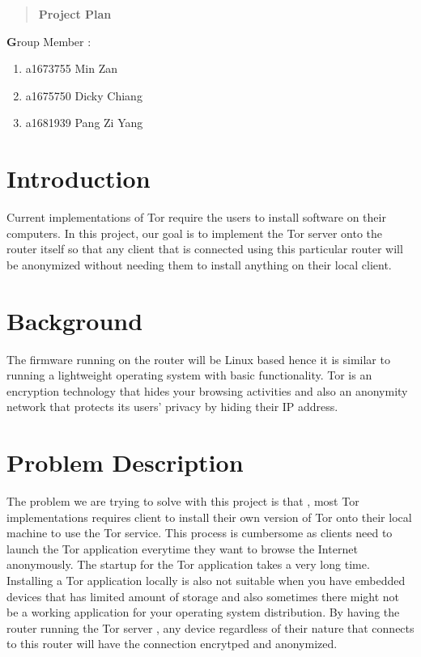 \documentclass[12pt]{article}
\begin{document}
	\begin{quote}
		\centering
		\textbf {Project Plan}
	\end{quote}
	
	\textbf Group Member :
	\begin{enumerate}
		\item a1673755 Min Zan 
		\item a1675750 Dicky Chiang 
		\item a1681939 Pang Zi Yang
	\end{enumerate}
	
	\section{Introduction}
	
	 Current implementations of Tor require the users to install software on their computers. In this project, our goal is to implement the Tor server onto the router itself so that any client that is connected using this particular router will be anonymized without needing them to install anything on their local client.
	
	
	\section{Background}
	The firmware running on the router will be Linux based hence it is similar to running a lightweight operating system with basic functionality. Tor is an encryption technology that hides your browsing activities and also an anonymity network that protects its users' privacy by hiding their IP address.
	
	\section{Problem Description}
	
	The problem we are trying to solve with this project is that , most Tor implementations requires client to install their own version of Tor onto their local machine to use the Tor service. This  process is cumbersome as clients need to launch the Tor application everytime they want to browse the Internet anonymously. The startup for the Tor application takes a very long time. Installing a Tor application locally is also not suitable when you have embedded devices that has limited amount of storage and also sometimes there might not be a working application for your operating system distribution. By having the router running the Tor server , any device regardless of their nature that connects to this router will have the connection encrytped and anonymized. 
	
\end{document}
